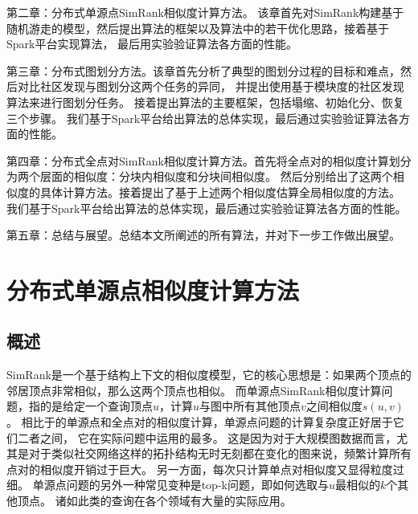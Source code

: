 \documentclass[master]{njuthesis}
\begin{document}
第二章：分布式单源点SimRank相似度计算方法。 
该章首先对SimRank构建基于随机游走的模型，然后提出算法的框架以及算法中的若干优化思路，接着基于Spark平台实现算法，
最后用实验验证算法各方面的性能。

第三章：分布式图划分方法。该章首先分析了典型的图划分过程的目标和难点，然后对比社区发现与图划分这两个任务的异同，
并提出使用基于模块度的社区发现算法来进行图划分任务。 接着提出算法的主要框架，包括塌缩、初始化分、恢复三个步骤。
我们基于Spark平台给出算法的总体实现，最后通过实验验证算法各方面的性能。

第四章：分布式全点对SimRank相似度计算方法。首先将全点对的相似度计算划分为两个层面的相似度：分块内相似度和分块间相似度。
然后分别给出了这两个相似度的具体计算方法。接着提出了基于上述两个相似度估算全局相似度的方法。
我们基于Spark平台给出算法的总体实现，最后通过实验验证算法各方面的性能。

第五章：总结与展望。总结本文所阐述的所有算法，并对下一步工作做出展望。


\chapter{分布式单源点相似度计算方法}\label{chapter_sssSimRank}
\section{概述}
SimRank是一个基于结构上下文的相似度模型，它的核心思想是：如果两个顶点的邻居顶点非常相似，那么这两个顶点也相似。
而单源点SimRank相似度计算问题，指的是给定一个查询顶点$u$，计算$u$与图中所有其他顶点$v$之间相似度$s(u,v)$。
相比于的单源点和全点对的相似度计算，单源点问题的计算复杂度正好居于它们二者之间，
它在实际问题中运用的最多。
这是因为对于大规模图数据而言，尤其是对于类似社交网络这样的拓扑结构无时无刻都在变化的图来说，频繁计算所有点对的相似度开销过于巨大。
另一方面，每次只计算单点对相似度又显得粒度过细。
单源点问题的另外一种常见变种是top\string-k问题，即如何选取与$u$最相似的$k$个其他顶点。
诸如此类的查询在各个领域有大量的实际应用。
\end{document}
